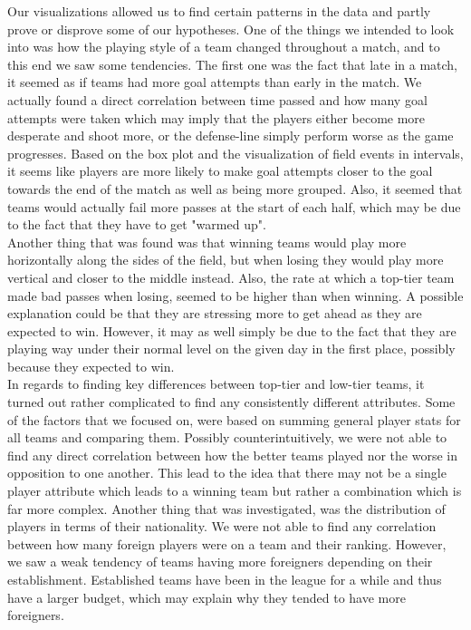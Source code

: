 \documentclass[Report.tex]{subfiles}
\begin{document}
 

Our visualizations allowed us to find certain patterns in the data and partly prove or disprove some of our hypotheses. One of the things we intended to look into was how the playing style of a team changed throughout a match, and to this end we saw some tendencies. The first one was the fact that late in a match, it seemed as if teams had more goal attempts than early in the match. We actually found a direct correlation between time passed and how many goal attempts were taken which may imply that the players either become more desperate and shoot more, or the defense-line simply perform worse as the game progresses. Based on the box plot and the visualization of field events in intervals, it seems like players are more likely to make goal attempts closer to the goal towards the end of the match as well as being more grouped. Also, it seemed that teams would actually fail more passes at the start of each half, which may be due to the fact that they have to get "warmed up".
\\

Another thing that was found was that winning teams would play more horizontally along the sides of the field, but when losing they would play more vertical and closer to the middle instead. Also, the rate at which a top-tier team made bad passes when losing, seemed to be higher than when winning. A possible explanation could be that they are stressing more to get ahead as they are expected to win. However, it may as well simply be due to the fact that they are playing way under their normal level on the given day in the first place, possibly because they expected to win.\\

In regards to finding key differences between top-tier and low-tier teams, it turned out rather complicated to find any consistently different attributes. Some of the factors that we focused on, were based on summing general player stats for all teams and comparing them. Possibly counterintuitively, we were not able to find any direct correlation between how the better teams played nor the worse in opposition to one another. This lead to the idea that there may not be a single player attribute which leads to a winning team but rather a combination which is far more complex. Another thing that was investigated, was the distribution of players in terms of their nationality. We were not able to find any correlation between how many foreign players were on a team and their ranking. However, we saw a weak tendency of teams having more foreigners depending on their establishment. Established teams have been in the league for a while and thus have a larger budget, which may explain why they tended to have more foreigners. \\
\end{document}
